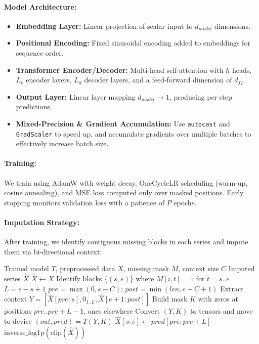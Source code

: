 \documentclass[10pt,twocolumn]{article}
\begin{document}
	\paragraph{Model Architecture:}
	\begin{itemize}
		\item \textbf{Embedding Layer:} Linear projection of scalar input to $d_{model}$ dimensions.
		\item \textbf{Positional Encoding:} Fixed sinusoidal encoding added to embeddings for sequence order.
		\item \textbf{Transformer Encoder/Decoder:} Multi-head self-attention with $h$ heads, $L_e$ encoder layers, $L_d$ decoder layers, and a feed-forward dimension of $d_{ff}$.
		\item \textbf{Output Layer:} Linear layer mapping $d_{model}\rightarrow1$, producing per-step predictions.
		\item \textbf{Mixed-Precision \& Gradient Accumulation:} Use \texttt{autocast} and \texttt{GradScaler} to speed up, and accumulate gradients over multiple batches to effectively increase batch size.
	\end{itemize}
	
	\paragraph{Training:}
	We train using AdamW with weight decay, OneCycleLR scheduling (warm-up, cosine annealing), and MSE loss computed only over masked positions. Early stopping monitors validation loss with a patience of $P$ epochs.
	
	\paragraph{Imputation Strategy:}
	After training, we identify contiguous missing blocks in each series and impute them via bi-directional context:
	
	\begin{algorithm}[H]
		\caption{Transformer-based Block Imputation}
		\begin{algorithmic}[1]
			\Require Trained model $T$, preprocessed data $X$, missing mask $M$, context size $C$
			\Ensure Imputed series $\hat{X}$
			\State $\hat{X} \gets X$
			\State Identify blocks $\{(s,e)\}$ where $M[i,t]=1$ for $t=s..e$
			\State $L = e - s + 1$
			\State $pre = \max(0, s-C)$; $post = \min(len, e+C+1)$
			\State Extract context $Y = [\hat{X}[pre:s], 0_{1..L}, \hat{X}[e+1:post]]$
			\State Build mask $K$ with zeros at positions $pre..pre+L-1$, ones elsewhere
			\State Convert $(Y,K)$ to tensors and move to device
			\State $(out, pred) = T(Y,K)$
			\State $\hat{X}[s:e] \gets pred[pre : pre+L]$
			\EndFor
			\EndFor
			\State \Return $\text{inverse\_log1p}(\text{clip}(\hat{X}))$
		\end{algorithmic}
	\end{algorithm}
	
\end{document}
